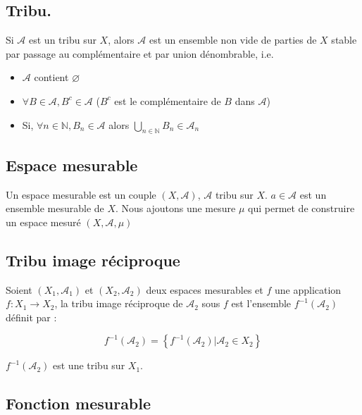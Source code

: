 \subsection{Tribu.} 

\noindent Si $\mathcal{A}$ est un tribu sur $X$, alors $\mathcal{A}$ est un ensemble non vide de parties de $X$ stable par passage au complémentaire et par union dénombrable, i.e.

\begin{itemize}
    \item $\mathcal{A}$ contient $\varnothing$ \newline
    \item $\forall B \in \mathcal{A}, B^{c} \in \mathcal{A}$ ($B^{c}$ est le complémentaire de $B$ dans $\mathcal{A}$) \newline
    \item Si, $\forall n \in \mathbb{N}, B_n \in \mathcal{A}$ alors $\bigcup_{n \in \mathbb{N}} B_n \in \mathcal{A}_n$ \newline
\end{itemize}

\subsection{Espace mesurable} 

\noindent Un espace mesurable est un couple $(X, \mathcal{A})$, $\mathcal{A}$ tribu sur $X$. $a \in \mathcal{A}$ est un ensemble mesurable de $X$. Nous ajoutons une mesure $\mu$ qui permet de construire un espace mesuré $(X, \mathcal{A}, \mu)$ \newline

\subsection{Tribu image réciproque}

\noindent Soient $(X_1, \mathcal{A}_1)$ et $(X_2, \mathcal{A}_2)$ deux espaces mesurables et $f$ une application $f : X_1 \rightarrow X_2$, la tribu image réciproque de $\mathcal{A_2}$ sous $f$ est l'ensemble $f^{-1}(\mathcal{A}_2)$ définit par : 

\begin{equation}
    f^{-1}(\mathcal{A}_2) = \left\{ f^{-1}(\mathcal{A}_2) | \mathcal{A}_2 \in X_2 \right\}
\end{equation}

$f^{-1}(\mathcal{A}_2)$ est une tribu sur $X_1$.

\subsection{Fonction mesurable}

